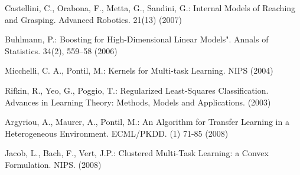 \begin{thebibliography}{4}
 Castellini, C., Orabona, F., Metta, G., Sandini, G.: Internal Models of Reaching and Grasping. Advanced Robotics. 21(13) (2007)



 Buhlmann, P.: Boosting for High-Dimensional Linear Models". Annals of Statistics. 34(2), 559–58 (2006)

 Micchelli, C. A., Pontil, M.: Kernels for Multi-task Learning. NIPS (2004)

 Rifkin, R., Yeo, G., Poggio, T.: Regularized Least-Squares Classification. Advances in Learning Theory: Methods, Models and Applications. (2003) 

 Argyriou, A., Maurer, A., Pontil, M.: An Algorithm for Transfer Learning in a Heterogeneous Environment. ECML/PKDD. (1) 71-85 (2008) 

 Jacob, L., Bach, F., Vert, J.P.: Clustered Multi-Task Learning: a Convex Formulation. NIPS. (2008) 

\end{thebibliography}